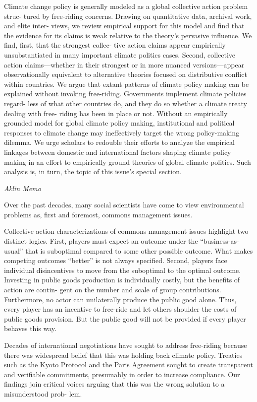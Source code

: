 \documentclass[
]{book}
\begin{document}
Climate change policy is generally modeled as a global collective action problem struc-
tured by free-riding concerns. Drawing on quantitative data, archival work, and elite inter-
views, we review empirical support for this model and ﬁnd that the evidence for its claims
is weak relative to the theory's pervasive inﬂuence. We ﬁnd, ﬁrst, that the strongest collec-
tive action claims appear empirically unsubstantiated in many important climate politics
cases. Second, collective action claims---whether in their strongest or in more nuanced
versions---appear observationally equivalent to alternative theories focused on distributive
conﬂict within countries. We argue that extant patterns of climate policy making can be
explained without invoking free-riding. Governments implement climate policies regard-
less of what other countries do, and they do so whether a climate treaty dealing with free-
riding has been in place or not. Without an empirically grounded model for global climate
policy making, institutional and political responses to climate change may ineffectively
target the wrong policy-making dilemma. We urge scholars to redouble their efforts to
analyze the empirical linkages between domestic and international factors shaping climate
policy making in an effort to empirically ground theories of global climate politics. Such
analysis is, in turn, the topic of this issue's special section.

\emph{Aklin Memo}

Over the past decades, many social scientists have come to view environmental
problems as, ﬁrst and foremost, commons management issues.

Collective action characterizations of commons management issues highlight
two distinct logics. First, players must expect an outcome under the ``business-as-
usual'' that is suboptimal compared to some other possible outcome. What makes
competing outcomes ``better'' is not always speciﬁed. Second, players face individual
disincentives to move from the suboptimal to the optimal outcome. Investing in
public goods production is individually costly, but the beneﬁts of action are contin-
gent on the number and scale of group contributions. Furthermore, no actor can
unilaterally produce the public good alone. Thus, every player has an incentive to
free-ride and let others shoulder the costs of public goods provision. But the public
good will not be provided if every player behaves this way.

Decades of
international negotiations have sought to address free-riding because there was
widespread belief that this was holding back climate policy. Treaties such as the
Kyoto Protocol and the Paris Agreement sought to create transparent and veriﬁable
commitments, presumably in order to increase compliance. Our ﬁndings join
critical voices arguing that this was the wrong solution to a misunderstood prob-
lem.
\end{document}
